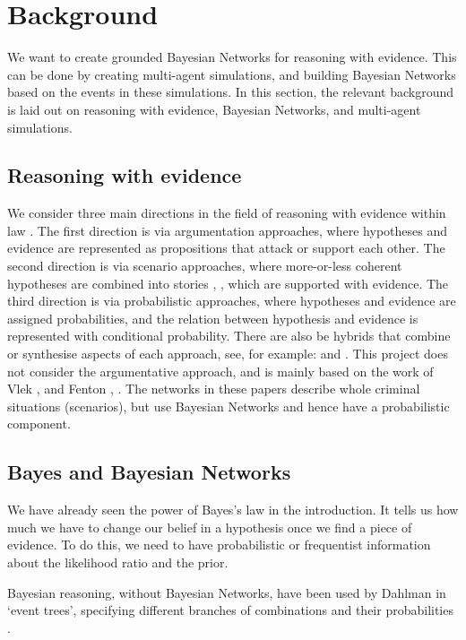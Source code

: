 
\chapter[Background]{Background}

We want to create grounded Bayesian Networks for reasoning with evidence. This can be done by creating multi-agent simulations, and building Bayesian Networks based on the events in these simulations. In this section, the relevant background is laid out on reasoning with evidence, Bayesian Networks, and multi-agent simulations.

\section{Reasoning with evidence}
We consider three main directions in the field of reasoning with evidence within law \citep{Verheij2015}. The first direction is via argumentation approaches, where hypotheses and evidence are represented as propositions that attack or support each other. The second direction is via scenario approaches, where more-or-less coherent hypotheses are combined into stories \citep{Pennington1993}, \citep{wagenaar1993}, which are supported with evidence. The third direction is via probabilistic approaches, where hypotheses and evidence are assigned probabilities, and the relation between hypothesis and evidence is represented with conditional probability. There are also be hybrids that combine or synthesise aspects of each approach, see, for example: \citep{Bex2010} and \citep{Timmer2016}. This project does not consider the argumentative approach, and is mainly based on the work of Vlek \citep{Vlek2015}, \citep{Vlek2016} and Fenton \citep{Fenton2012}, \citep{Fenton2019}. The networks in these papers describe whole criminal situations (scenarios), but use Bayesian Networks and hence have a probabilistic component.


\section{Bayes and Bayesian Networks}

We have already seen the power of Bayes's law in the introduction. It tells us how much we have to change our belief in a hypothesis once we find a piece of evidence. To do this, we need to have probabilistic or frequentist information about the likelihood ratio and the prior. 

Bayesian reasoning, without Bayesian Networks, have been used by Dahlman in `event trees', specifying different branches of combinations and their probabilities \citep{dahlman2020}.

